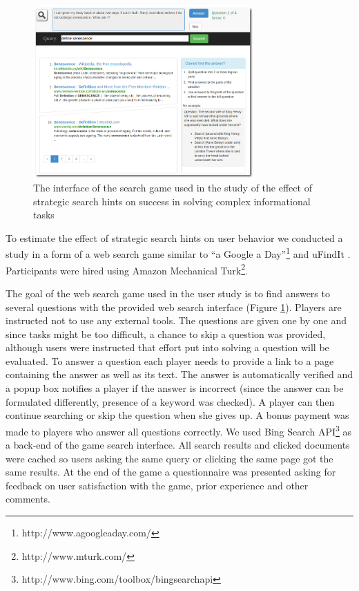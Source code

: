 \begin{figure}
\centering
\includegraphics[width=0.75\textwidth]{img/hints_ufindit}
\caption{The interface of the search game used in the study of the effect of strategic search hints on success in solving complex informational tasks}
\label{figure:users:hints:ufindit}
\end{figure}

To estimate the effect of strategic search hints on user behavior we conducted a study in a form of a web search game similar to ``a Google a Day''\footnote{http://www.agoogleaday.com/} and uFindIt \cite{Ageev:2011:FYG:2009916.2009965}. Participants were hired using Amazon Mechanical Turk\footnote{http://www.mturk.com/}. 

The goal of the web search game used in the user study is to find answers to several questions with the provided web search interface (Figure \ref{figure:users:hints:ufindit}). 
Players are instructed not to use any external tools.
The questions are given one by one and since tasks might be too difficult, a chance to skip a question was provided, although users were instructed that effort put into solving a question will be evaluated.
To answer a question each player needs to provide a link to a page containing the answer as well as its text.
The answer is automatically verified and a popup box notifies a player if the answer is incorrect (since the answer can be formulated differently, presence of a keyword was checked).
A player can then continue searching or skip the question when she gives up.
A bonus payment was made to players who answer all questions correctly.
We used Bing Search API\footnote{http://www.bing.com/toolbox/bingsearchapi} as a back-end of the game search interface.
All search results and clicked documents were cached so users asking the same query or clicking the same page got the same results.
At the end of the game a questionnaire was presented asking for feedback on user satisfaction with the game, prior experience and other comments.

